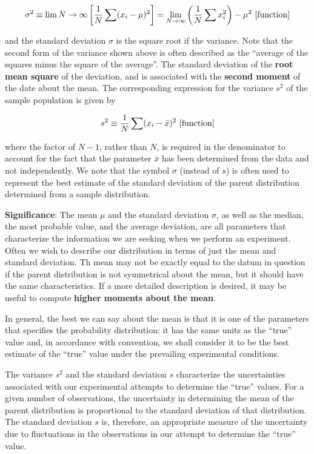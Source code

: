 \documentclass[a4paper,10pt]{article}
\begin{document}
\begin{align*}
    \sigma^2 \equiv \lim{N\rightarrow\infty} \left[\frac{1}{N}\sum(x_i-\mu)^2\right] = \lim_{N\rightarrow\infty} \left(\frac{1}{N}\sum x_i^2\right)-\mu^2 ~ [{\rm function}]
\end{align*}

{\noindent}and the standard deviation $\sigma$ is the square root if the variance. Note that the second form of the variance shown above is often described as the ``average of the squares minus the square of the average''. The standard deviation of the \textbf{root mean square} of the deviation, and is associated with the \textbf{second moment} of the date about the mean. The corresponding expression for the variance $s^2$ of the sample population is given by

\begin{align*}
    s^2 \equiv \frac{1}{N} \sum (x_i-\bar{x})^2 ~ [{\rm function}]
\end{align*}

{\noindent}where the factor of $N-1$, rather than $N$, is required in the denominator to account for the fact that the parameter $\bar{x}$ has been determined from the data and not independently. We note that the symbol $\sigma$ (instead of $s$) is often used to represent the best estimate of the standard deviation of the parent distribution determined from a sample distribution.

{\noindent}\textbf{Significance}: The mean $\mu$ and the standard deviation $\sigma$, as well as the median, the most probable value, and the average deviation, are all parameters that characterize the information we are seeking when we perform an experiment. Often we wish to describe our distribution in terms of just the mean and standard deviation. Th mean may not be exactly equal to the datum in question if the parent distribution is not symmetrical about the mean, but it should have the same characteristics. If a more detailed description is desired, it may be useful to compute \textbf{higher moments about the mean}.

{\noindent}In general, the best we can say about the mean is that it is one of the parameters that specifies the probability distribution: it has the same units as the ``true'' value and, in accordance with convention, we shall consider it to be the best estimate of the ``true'' value under the prevailing experimental conditions.

{\noindent}The variance $s^2$ and the standard deviation $s$ characterize the uncertainties associated with our experimental attempts to determine the ``true'' values. For a given number of observations, the uncertainty in determining the mean of the parent distribution is proportional to the standard deviation of that distribution. The standard deviation $s$ is, therefore, an appropriate measure of the uncertainty due to fluctuations in the observations in our attempt to determine the ``true'' value.
\end{document}
